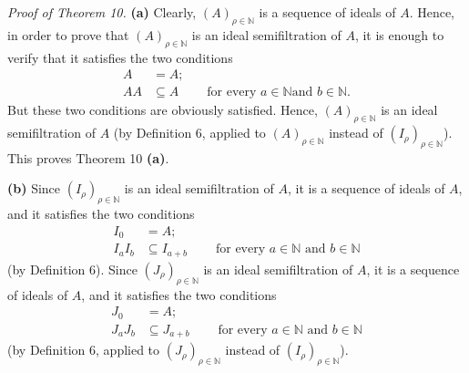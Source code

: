 \documentclass[12pt,final,notitlepage,onecolumn]{article}%
\begin{document}
\textit{Proof of Theorem 10.} \textbf{(a)} Clearly, $\left(  A\right)
_{\rho\in\mathbb{N}}$ is a sequence of ideals of $A$. Hence, in order to prove
that $\left(  A\right)  _{\rho\in\mathbb{N}}$ is an ideal semifiltration of
$A$, it is enough to verify that it satisfies the two conditions%
\begin{align*}
A  &  =A;\\
AA  &  \subseteq A\ \ \ \ \ \ \ \ \ \ \text{for every }a\in\mathbb{N}\text{
and }b\in\mathbb{N}.
\end{align*}
But these two conditions are obviously satisfied. Hence, $\left(  A\right)
_{\rho\in\mathbb{N}}$ is an ideal semifiltration of $A$ (by Definition 6,
applied to $\left(  A\right)  _{\rho\in\mathbb{N}}$ instead of $\left(
I_{\rho}\right)  _{\rho\in\mathbb{N}}$). This proves Theorem 10 \textbf{(a)}.

\textbf{(b)} Since $\left(  I_{\rho}\right)  _{\rho\in\mathbb{N}}$ is an ideal
semifiltration of $A$, it is a sequence of ideals of $A$, and it satisfies the
two conditions%
\begin{align*}
I_{0}  &  =A;\\
I_{a}I_{b}  &  \subseteq I_{a+b}\ \ \ \ \ \ \ \ \ \ \text{for every }%
a\in\mathbb{N}\text{ and }b\in\mathbb{N}%
\end{align*}
(by Definition 6). Since $\left(  J_{\rho}\right)  _{\rho\in\mathbb{N}}$ is an
ideal semifiltration of $A$, it is a sequence of ideals of $A$, and it
satisfies the two conditions%
\begin{align*}
J_{0}  &  =A;\\
J_{a}J_{b}  &  \subseteq J_{a+b}\ \ \ \ \ \ \ \ \ \ \text{for every }%
a\in\mathbb{N}\text{ and }b\in\mathbb{N}%
\end{align*}
(by Definition 6, applied to $\left(  J_{\rho}\right)  _{\rho\in\mathbb{N}}$
instead of $\left(  I_{\rho}\right)  _{\rho\in\mathbb{N}}$).
\end{document}
